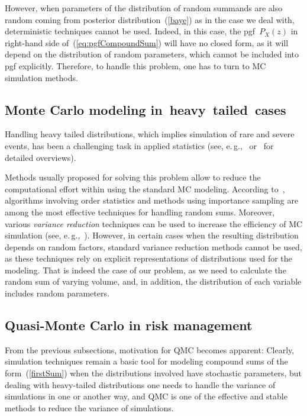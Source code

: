 \begin{multicols}{2}
However, when parameters of the distribution of random summands are
also random coming from posterior distribution~(\ref{baye}) as in
the case we deal with, deterministic techniques cannot be used.
Indeed, in this case, the pgf~$P_X(z)$ in right-hand side
of~(\ref{eq:pgfCompoundSum}) will have no closed form, as it will
depend on the distribution of random parameters, which cannot be
included into pgf explicitly. Therefore, to handle this problem, one
has to turn to MC simulation methods.

\subsection{Monte Carlo modeling in~heavy~tailed~cases}

\noindent
Handling heavy tailed distributions, which implies simulation of
rare and severe events, has been a challenging task in applied
statistics (see, e.\,g.,~\cite{Asmus-t} or~\cite{Huang} for detailed
overviews).

Methods usually proposed for solving this problem allow to reduce
the computational effort within using the standard MC modeling.
According to~\cite{Asmus-t}, algorithms involving order statistics and
methods using importance sampling are among the most effective
techniques for handling random sums.
Moreover, various {\it variance reduction} techniques can be used to
increase the efficiency of MC simulation (see, e.\,g.,~\cite{Glasserman, Robert}).
However, in certain cases when the resulting
distribution depends on random factors, standard variance reduction
methods cannot be used, as these techniques rely on explicit
representations of distributions used for the modeling. That is
indeed the case of our problem, as we need to calculate the random
sum of varying volume, and, in addition, the distribution of each
variable includes random parameters.

\subsection{Quasi-Monte Carlo in risk management}

\noindent
From the previous subsections, motivation for QMC becomes
apparent: Clearly, simulation techniques remain a basic tool for
modeling compound sums of the form~(\ref{firstSum}) when the
distributions involved have stochastic parameters, but dealing
with heavy-tailed distributions one needs to handle the variance
of simulations in one or another way, and QMC is one of the
effective and stable methods to reduce the variance of
simulations.


\end{multicols}
